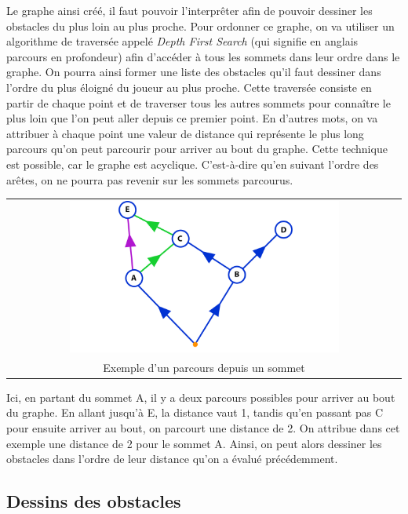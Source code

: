 \documentclass[11pt,french,a4paper,]{article}
\begin{document}
Le graphe ainsi créé, il faut pouvoir l'interprêter afin de pouvoir
dessiner les obstacles du plus loin au plus proche. Pour ordonner ce
graphe, on va utiliser un algorithme de traversée appelé \emph{Depth
First Search} (qui signifie en anglais parcours en profondeur) afin
d'accéder à tous les sommets dans leur ordre dans le graphe. On pourra
ainsi former une liste des obstacles qu'il faut dessiner dans l'ordre du
plus éloigné du joueur au plus proche. Cette traversée consiste en
partir de chaque point et de traverser tous les autres sommets pour
connaître le plus loin que l'on peut aller depuis ce premier point. En
d'autres mots, on va attribuer à chaque point une valeur de distance qui
représente le plus long parcours qu'on peut parcourir pour arriver au
bout du graphe. Cette technique est possible, car le graphe est
acyclique. C'est-à-dire qu'en suivant l'ordre des arêtes, on ne pourra
pas revenir sur les sommets parcourus.

\begin{longtable}[]{@{}c@{}}
\toprule
\endhead
\includegraphics[width=0.7\textwidth,height=\textheight]{../img/Graphs/dfs_A.png}\tabularnewline
Exemple d'un parcours depuis un sommet\tabularnewline
\bottomrule
\end{longtable}

Ici, en partant du sommet A, il y a deux parcours possibles pour arriver
au bout du graphe. En allant jusqu'à E, la distance vaut 1, tandis qu'en
passant pas C pour ensuite arriver au bout, on parcourt une distance de
2. On attribue dans cet exemple une distance de 2 pour le sommet A.
Ainsi, on peut alors dessiner les obstacles dans l'ordre de leur
distance qu'on a évalué précédemment.

\hypertarget{dessins-des-obstacles}{%
\subsection{Dessins des obstacles}\label{dessins-des-obstacles}}
\end{document}
